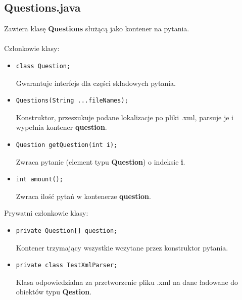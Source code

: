 \documentclass[12pt, a4paper]{article}
\begin{document}
\subsection{Questions.java}
Zawiera klasę \textbf{Questions} służącą jako kontener na pytania.\\\\
Członkowie klasy:
\begin{itemize}
\item\begin{lstlisting}
class Question;
\end{lstlisting}
Gwarantuje interfejs dla części składowych pytania.
\item\begin{lstlisting}
Questions(String ...fileNames);
\end{lstlisting}
Konstruktor, przeszukuje podane lokalizacje po pliki .xml, parsuje je i wypełnia kontener \textbf{question}.
\item\begin{lstlisting}
Question getQuestion(int i);
\end{lstlisting}
Zwraca pytanie (element typu \textbf{Question}) o indeksie \textbf{i}.
\item\begin{lstlisting}
int amount();
\end{lstlisting}
Zwraca ilość pytań w kontenerze \textbf{question}.
\end{itemize}
Prywatni członkowie klasy:
\begin{itemize}
\item\begin{lstlisting}
private Question[] question;
\end{lstlisting}
Kontener trzymający wszystkie wczytane przez konstruktor pytania.
\item\begin{lstlisting}
private class TestXmlParser;
\end{lstlisting}
Klasa odpowiedzialna za przetworzenie pliku .xml na dane ładowane do obiektów typu \textbf{Qestion}.
\end{itemize}
\end{document}
